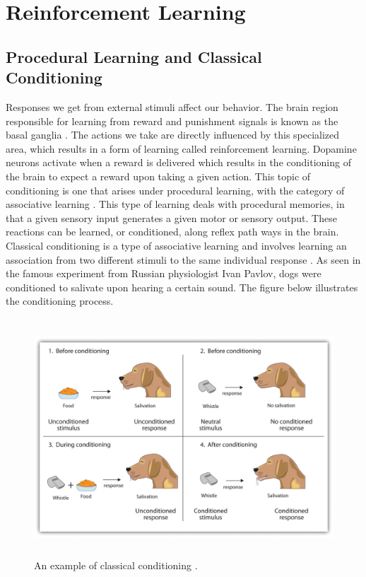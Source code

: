 \documentclass[12pt]{article}
\begin{document}
\section{Reinforcement Learning}
\subsection{Procedural Learning and Classical Conditioning}
Responses we get from external stimuli affect our behavior. The brain region responsible for learning from reward and punishment signals is known as the basal ganglia \cite{c3}. The actions we take are directly influenced by this specialized area, which results in a form of learning called reinforcement learning. Dopamine neurons activate when a reward is delivered which results in the conditioning of the brain to expect a reward upon taking a given action. This topic of conditioning is one that arises under procedural learning, with the category of associative learning \cite{c7}. This type of learning deals with procedural memories, in that a given sensory input generates a given motor or sensory output. These reactions can be learned, or conditioned, along reflex path ways in the brain. Classical conditioning is a type of associative learning and involves learning an association from two different stimuli to the same individual response \cite{c7, c18}. As seen in the famous experiment from Russian physiologist Ivan Pavlov, dogs were conditioned to salivate upon hearing a certain sound. The figure below illustrates the conditioning process.
\newpage

\begin{figure}[ht!] %
\centering
\hspace*{-0.3cm} 
\includegraphics[height=3.5in]{conditioning.JPG}
\caption{An example of classical conditioning \cite{c18}.}
\label{conditioning}
\end{figure}
\end{document}
